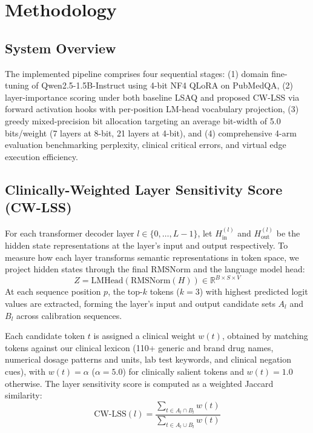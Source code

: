 \documentclass[conference]{IEEEtran}
\begin{document}
\section{Methodology}

\subsection{System Overview}
The implemented pipeline comprises four sequential stages: (1) domain fine-tuning of Qwen2.5-1.5B-Instruct using 4-bit NF4 QLoRA on PubMedQA, (2) layer-importance scoring under both baseline LSAQ and proposed CW-LSS via forward activation hooks with per-position LM-head vocabulary projection, (3) greedy mixed-precision bit allocation targeting an average bit-width of 5.0 bits/weight (7 layers at 8-bit, 21 layers at 4-bit), and (4) comprehensive 4-arm evaluation benchmarking perplexity, clinical critical errors, and virtual edge execution efficiency.

\subsection{Clinically-Weighted Layer Sensitivity Score (CW-LSS)}
For each transformer decoder layer $l \in \{0, \dots, L-1\}$, let $H_{\text{in}}^{(l)}$ and $H_{\text{out}}^{(l)}$ be the hidden state representations at the layer's input and output respectively. To measure how each layer transforms semantic representations in token space, we project hidden states through the final RMSNorm and the language model head:
\begin{equation}
Z = \text{LMHead}(\text{RMSNorm}(H)) \in \mathbb{R}^{B \times S \times V}
\end{equation}
At each sequence position $p$, the top-$k$ tokens ($k = 3$) with highest predicted logit values are extracted, forming the layer's input and output candidate sets $A_l$ and $B_l$ across calibration sequences.

Each candidate token $t$ is assigned a clinical weight $w(t)$, obtained by matching tokens against our clinical lexicon (110+ generic and brand drug names, numerical dosage patterns and units, lab test keywords, and clinical negation cues), with $w(t) = \alpha$ ($\alpha = 5.0$) for clinically salient tokens and $w(t) = 1.0$ otherwise. The layer sensitivity score is computed as a weighted Jaccard similarity:
\begin{equation}
\text{CW-LSS}(l) = \frac{\sum_{t \in A_l \cap B_l} w(t)}{\sum_{t \in A_l \cup B_l} w(t)}
\end{equation}
\end{document}
